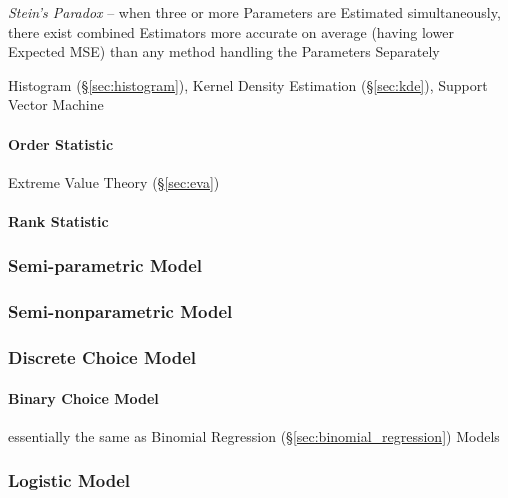 \emph{Stein's Paradox} -- when three or more Parameters are Estimated
simultaneously, there exist combined Estimators more accurate on average (having
lower Expected MSE) than any method handling the Parameters Separately

Histogram (\S\ref{sec:histogram}), Kernel Density Estimation (\S\ref{sec:kde}),
Support Vector Machine



\paragraph{Order Statistic}\label{sec:order_statistic}\hfill

Extreme Value Theory (\S\ref{sec:eva})



\paragraph{Rank Statistic}\label{sec:rank_statistic}\hfill



\subsubsection{Semi-parametric Model}\label{sec:semiparametric_model}

\subsubsection{Semi-nonparametric Model}\label{sec:seminonparametric_model}

\subsubsection{Discrete Choice Model}\label{sec:discrete_choice_model}

\paragraph{Binary Choice Model}\label{sec:binary_choice}\hfill

essentially the same as Binomial Regression
(\S\ref{sec:binomial_regression}) Models



\subsubsection{Logistic Model}\label{sec:discrete_uniform_law}

